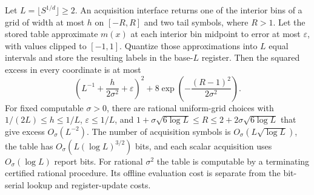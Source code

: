\begin{proposition}
\label{prop:v10-gaussian-precision}
Let $L=\lfloor S^{1/d}\rfloor\ge2$. An acquisition interface returns
one of the interior bins of a grid of width at most $h$ on $[-R,R]$
and two tail symbols, where $R>1$. Let the stored table approximate
$m(x)$ at each interior bin midpoint to error at most $\varepsilon$,
with values clipped to $[-1,1]$. Quantize those approximations into
$L$ equal intervals and store the resulting labels in the base-$L$
register. Then the squared excess in every coordinate is at most
\begin{equation}\label{eq:v10-gaussian-precision}
 \left(L^{-1}+\frac{h}{2\sigma^2}+\varepsilon\right)^2
 +8\exp\left(-\frac{(R-1)^2}{2\sigma^2}\right).
\end{equation}
For fixed computable $\sigma>0$, there are rational uniform-grid
choices with $1/(2L)\le h\le1/L$, $\varepsilon\le1/L$, and
$1+\sigma\sqrt{6\log L}\le R\le2+2\sigma\sqrt{6\log L}$
that give excess $O_{\sigma}(L^{-2})$.
The number of acquisition symbols is $O_\sigma(L\sqrt{\log L})$,
the table has $O_\sigma(L(\log L)^{3/2})$ bits, and each scalar
acquisition uses $O_\sigma(\log L)$ report bits. For rational
$\sigma^2$ the table is computable by a terminating certified
rational procedure. Its offline evaluation cost is separate from
the bit-serial lookup and register-update costs.
\end{proposition}

